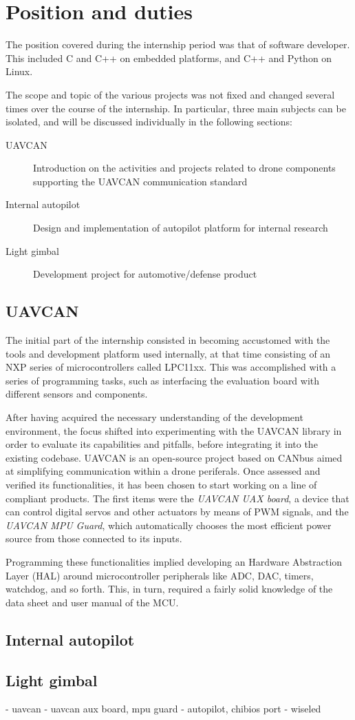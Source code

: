 \section{Position and duties}
The position covered during the internship period was that of software developer.
This included C and C++ on embedded platforms, and C++ and Python on Linux.

The scope and topic of the various projects was not fixed and changed several times over the course of the internship. 
In particular, three main subjects can be isolated, and will be discussed individually in the following sections:

\begin{description}  
\item [UAVCAN] Introduction on the activities and projects related to drone components supporting the UAVCAN communication standard
\item [Internal autopilot] Design and implementation of autopilot platform for internal research  
\item [Light gimbal] Development project for automotive/defense product 
\end{description}


\subsection{UAVCAN}
The initial part of the internship consisted in becoming accustomed with the tools and development platform used internally, at that time consisting of an NXP series of microcontrollers called LPC11xx.
This was accomplished with a series of programming tasks, such as interfacing the evaluation board with different sensors and components.

After having acquired the necessary understanding of the development environment, the focus shifted into experimenting with the UAVCAN library in order to evaluate its capabilities and pitfalls, before integrating it into the existing codebase.
UAVCAN is an open-source project based on CANbus aimed at simplifying communication within a drone periferals.
Once assessed and verified its functionalities, it has been chosen to start working on a line of compliant products.
The first items were the \emph{UAVCAN UAX board}, a device that can control digital servos and other actuators by means of PWM signals, and the \emph{UAVCAN MPU Guard}, which automatically chooses the most efficient power source from those connected to its inputs.

Programming these functionalities implied developing an Hardware Abstraction Layer (HAL) around microcontroller peripherals like ADC, DAC, timers, watchdog, and so forth.
This, in turn, required a fairly solid knowledge of the data sheet and user manual of the MCU.


\subsection{Internal autopilot}



\subsection{Light gimbal}




- uavcan
- uavcan aux board, mpu guard
- autopilot, chibios port
- wiseled